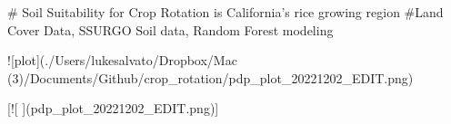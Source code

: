 # Soil Suitability for Crop Rotation is California's rice growing region
#Land Cover Data, SSURGO Soil data, Random Forest modeling



![plot](./Users/lukesalvato/Dropbox/Mac (3)/Documents/Github/crop_rotation/pdp_plot_20221202_EDIT.png)

[![ ](pdp_plot_20221202_EDIT.png)]